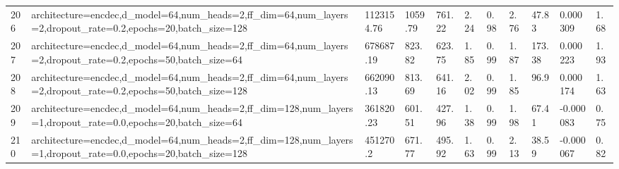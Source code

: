 \begin{longtable}{C{0.8cm} L{2cm} C{1.15cm} C{1.15cm} C{1.15cm} C{1.15cm} C{0.85cm} C{1.25cm} C{1.2cm} C{1.5cm} C{1.0cm}}
206 & architecture=encdec,\newline d\_model=64,\newline num\_heads=2,\newline ff\_dim=64,\newline num\_layers=2,\newline dropout\_rate=0.2,\newline epochs=20,\newline batch\_size=128 & 1123154.76 & 1059.79 & 761.22 & 2.24 & 0.98 & 2.76 & 47.83 & 0.000309 & 1.68 \\
207 & architecture=encdec,\newline d\_model=64,\newline num\_heads=2,\newline ff\_dim=64,\newline num\_layers=2,\newline dropout\_rate=0.2,\newline epochs=50,\newline batch\_size=64 & 678687.19 & 823.82 & 623.75 & 1.85 & 0.99 & 1.87 & 173.38 & 0.000223 & 1.93 \\
208 & architecture=encdec,\newline d\_model=64,\newline num\_heads=2,\newline ff\_dim=64,\newline num\_layers=2,\newline dropout\_rate=0.2,\newline epochs=50,\newline batch\_size=128 & 662090.13 & 813.69 & 641.16 & 2.02 & 0.99 & 1.85 & 96.9 & 0.000174 & 1.63 \\
209 & architecture=encdec,\newline d\_model=64,\newline num\_heads=2,\newline ff\_dim=128,\newline num\_layers=1,\newline dropout\_rate=0.0,\newline epochs=20,\newline batch\_size=64 & 361820.23 & 601.51 & 427.96 & 1.38 & 0.99 & 1.98 & 67.41 & -0.000083 & 0.75 \\
210 & architecture=encdec,\newline d\_model=64,\newline num\_heads=2,\newline ff\_dim=128,\newline num\_layers=1,\newline dropout\_rate=0.0,\newline epochs=20,\newline batch\_size=128 & 451270.2 & 671.77 & 495.92 & 1.63 & 0.99 & 2.13 & 38.59 & -0.000067 & 0.82 \\

\end{longtable}
